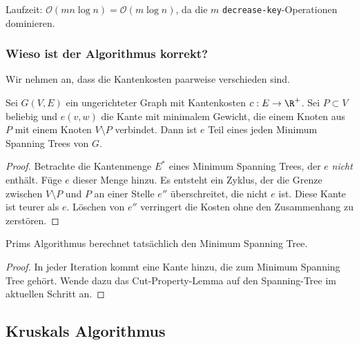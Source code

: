 \documentclass[11pt]{scrartcl}
\renewcommand{\O}{\mathcal{O}}
\begin{document}
Laufzeit: $\O(mn \log n) = \O(m\log n)$, da die $m$ \texttt{decrease-key}-Operationen dominieren.

\subsubsection{Wieso ist der Algorithmus korrekt?}

Wir nehmen an, dass die Kantenkosten paarweise verschieden sind.

\begin{lem}
	Sei $G(V,E)$ ein ungerichteter Graph mit Kantenkosten $c:E\to \R^+$.
	Sei $P\subset V$ beliebig und $e(v,w)$ die Kante mit minimalem Gewicht, die einem Knoten aus $P$ mit einem Knoten $V\setminus P$ verbindet.
	Dann ist $e$ Teil eines jeden Minimum Spanning Trees von $G$.
	\begin{proof}
		Betrachte die Kantenmenge $E^*$ eines Minimum Spanning Trees, der $e$ \emph{nicht} enthält.
		Füge $e$ dieser Menge hinzu.
		Es entsteht ein Zyklus, der die Grenze zwischen $V\setminus P$ und $P$ an einer Stelle $e''$ überschreitet, die nicht $e$ ist.
		Diese Kante ist teurer als $e$.
		Löschen von $e''$ verringert die Kosten ohne den Zusammenhang zu zerstören.
	\end{proof}
\end{lem}

\begin{kor}
	Prims Algorithmus berechnet tatsächlich den Minimum Spanning Tree.
	\begin{proof}
		In jeder Iteration kommt eine Kante hinzu, die zum Minimum Spanning Tree gehört.
		Wende dazu das Cut-Property-Lemma auf den Spanning-Tree im aktuellen Schritt an.
	\end{proof}
\end{kor}


\subsection{Kruskals Algorithmus}
\end{document}
